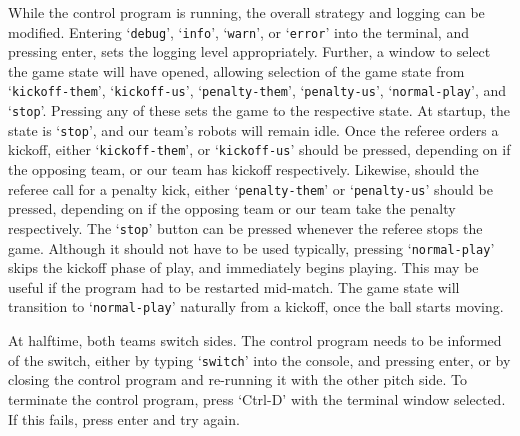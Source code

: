 While the control program is running, the overall strategy and logging can be
modified. Entering `\texttt{debug}', `\texttt{info}', `\texttt{warn}', or
`\texttt{error}' into the terminal, and pressing enter, sets the logging level
appropriately.  Further, a window to select the game state will have opened,
allowing selection of the game state from `\texttt{kickoff-them}',
`\texttt{kickoff-us}', `\texttt{penalty-them}', `\texttt{penalty-us}',
`\texttt{normal-play}', and `\texttt{stop}'. Pressing any of these sets the
game to the respective state.  At startup, the state is `\texttt{stop}', and
our team's robots will remain idle.  Once the referee orders a kickoff, either
`\texttt{kickoff-them}', or `\texttt{kickoff-us}' should be pressed, depending
on if the opposing team, or our team has kickoff respectively. Likewise, should
the referee call for a penalty kick, either `\texttt{penalty-them}' or
`\texttt{penalty-us}' should be pressed, depending on if the opposing team or
our team take the penalty respectively. The `\texttt{stop}' button can be
pressed whenever the referee stops the game.  Although it should not have to be
used typically, pressing `\texttt{normal-play}' skips the kickoff phase of
play, and immediately begins playing. This may be useful if the program had to
be restarted mid-match. The game state will transition to
`\texttt{normal-play}' naturally from a kickoff, once the ball starts moving.

At halftime, both teams switch sides. The control program needs to be informed
of the switch, either by typing `\texttt{switch}' into the console, and
pressing enter, or by closing the control program and re-running it with the
other pitch side. To terminate the control program, press `Ctrl-D' with the
terminal window selected. If this fails, press enter and try again.
